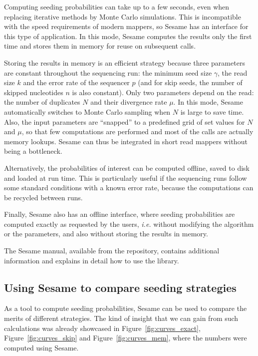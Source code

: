 \documentclass{article}
\begin{document}
Computing seeding probabilities can take up to a few seconds, even when
replacing iterative methods by Monte Carlo simulations. This is
incompatible with the speed requirements of modern mappers, so Sesame has
an interface for this type of application. In this mode, Sesame computes
the results only the first time and stores them in memory for reuse on
subsequent calls.

Storing the results in memory is an efficient strategy because three
parameters are constant throughout the sequencing run: the minimum seed
size $\gamma$, the read size $k$ and the error rate of the sequencer $p$
(and for skip seeds, the number of skipped nucleotides $n$ is also
constant). Only two parameters depend on the read: the number of
duplicates $N$ and their divergence rate $\mu$. In this mode, Sesame
automatically switches to Monte Carlo sampling when $N$ is large to save
time. Also, the input parameters are ``snapped'' to a predefined grid of
set values for $N$ and $\mu$, so that few computations are performed and
most of the calls are actually memory lookups. Sesame can thus be
integrated in short read mappers without being a bottleneck.

Alternatively, the probabilities of interest can be computed offline,
saved to disk and loaded at run time. This is particularly useful if the
sequencing runs follow some standard conditions with a known error rate,
because the computations can be recycled between runs.

Finally, Sesame also has an offline interface, where seeding probabilities
are computed exactly as requested by the users, \textit{i.e.} without
modifying the algorithm or the parameters, and also without storing the
results in memory.

The Sesame manual, available from the repository, contains additional
information and explains in detail how to use the library.


\subsection{Using Sesame to compare seeding strategies}

As a tool to compute seeding probabilities, Sesame can be used to compare
the merits of different strategies. The kind of insight that we can gain
from such calculations was already showcased in
Figure~\ref{fig:curves_exact}, Figure~\ref{fig:curves_skip} and
Figure~\ref{fig:curves_mem}, where the numbers were computed using Sesame.
\end{document}
